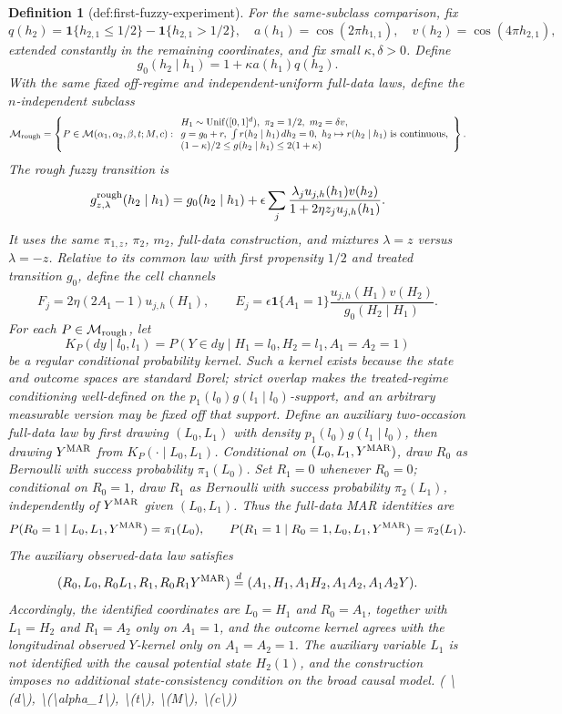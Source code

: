 \documentclass{article}
\newtheorem{definition}{Definition}
\begin{document}
\begin{definition}[def:first-fuzzy-experiment]
For the same-subclass comparison, fix
\[
q(h_2)=\mathbf1\{h_{2,1}\le1/2\}-\mathbf1\{h_{2,1}>1/2\},\quad
a(h_1)=\cos(2\pi h_{1,1}),\quad
v(h_2)=\cos(4\pi h_{2,1}),
\]
extended constantly in the remaining coordinates, and fix small \(\kappa,\delta>0\). Define
\[
g_0(h_2\mid h_1)=1+\kappa a(h_1)q(h_2).
\]
With the same fixed off-regime and independent-uniform full-data laws, define the \(n\)-independent subclass
\[
\mathcal M_{\rm rough}
=\left\{P\in\mathcal M(\alpha_1,\alpha_2,\beta,t;M,c):
\begin{array}{l}
H_1\sim{\rm Unif}([0,1]^d),\ \pi_2=1/2,\ m_2=\delta v,\\
g=g_0+r,\ \int r(h_2\mid h_1)\,dh_2=0,\ 
h_2\mapsto r(h_2\mid h_1)\ {\rm is\ continuous},\\
(1-\kappa)/2\le g(h_2\mid h_1)\le2(1+\kappa)
\end{array}\right\}.
\]
The rough fuzzy transition is
\[
g^{\rm rough}_{z,\lambda}(h_2\mid h_1)
=g_0(h_2\mid h_1)+
\epsilon\sum_j\frac{\lambda_ju_{j,h}(h_1)v(h_2)}
 {1+2\eta z_ju_{j,h}(h_1)}.
\]
It uses the same \(\pi_{1,z}\), \(\pi_2\), \(m_2\), full-data construction, and mixtures \(\lambda=z\) versus \(\lambda=-z\). Relative to its common law with first propensity \(1/2\) and treated transition \(g_0\), define the cell channels
\[
F_j=2\eta(2A_1-1)u_{j,h}(H_1),\qquad
E_j=\epsilon\mathbf1\{A_1=1\}
\frac{u_{j,h}(H_1)v(H_2)}{g_0(H_2\mid H_1)}.
\]
For each \(P\in\mathcal M_{\rm rough}\), let
\[
K_P(dy\mid l_0,l_1)
=P(Y\in dy\mid H_1=l_0,H_2=l_1,A_1=A_2=1)
\]
be a regular conditional probability kernel. Such a kernel exists because the state and outcome spaces are standard Borel; strict overlap makes the treated-regime conditioning well-defined on the \(p_1(l_0)g(l_1\mid l_0)\)-support, and an arbitrary measurable version may be fixed off that support. Define an auxiliary two-occasion full-data law by first drawing \((L_0,L_1)\) with density \(p_1(l_0)g(l_1\mid l_0)\), then drawing \(Y^{\rm MAR}\) from \(K_P(\cdot\mid L_0,L_1)\). Conditional on \((L_0,L_1,Y^{\rm MAR})\), draw \(R_0\) as Bernoulli with success probability \(\pi_1(L_0)\). Set \(R_1=0\) whenever \(R_0=0\); conditional on \(R_0=1\), draw \(R_1\) as Bernoulli with success probability \(\pi_2(L_1)\), independently of \(Y^{\rm MAR}\) given \((L_0,L_1)\). Thus the full-data MAR identities are
\[
P(R_0=1\mid L_0,L_1,Y^{\rm MAR})=\pi_1(L_0),
\qquad
P(R_1=1\mid R_0=1,L_0,L_1,Y^{\rm MAR})=\pi_2(L_1).
\]
The auxiliary observed-data law satisfies
\[
(R_0,L_0,R_0L_1,R_1,R_0R_1Y^{\rm MAR})
\overset{d}{=}
(A_1,H_1,A_1H_2,A_1A_2,A_1A_2Y).
\]
Accordingly, the identified coordinates are \(L_0=H_1\) and \(R_0=A_1\), together with \(L_1=H_2\) and \(R_1=A_2\) only on \(A_1=1\), and the outcome kernel agrees with the longitudinal observed \(Y\)-kernel only on \(A_1=A_2=1\). The auxiliary variable \(L_1\) is not identified with the causal potential state \(H_2(1)\), and the construction imposes no additional state-consistency condition on the broad causal model. \quad ( \textbackslash{}(d\textbackslash{}), \textbackslash{}(\textbackslash{}alpha\_1\textbackslash{}), \textbackslash{}(t\textbackslash{}), \textbackslash{}(M\textbackslash{}), \textbackslash{}(c\textbackslash{}))
\end{definition}
\end{document}
